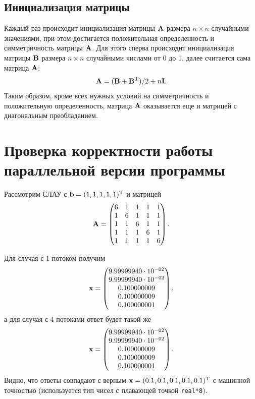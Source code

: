 \documentclass[12pt]{article}
\begin{document}
\subsection{Инициализация матрицы}

Каждый раз происходит инициализация матрицы $\vb{A}$ размера $n\times n$ случайными значениями, при этом достигается положительная определенность и симметричность матрицы $\vb{A}$. Для этого сперва происходит инициализация матрицы $\vb{B}$ размера $n\times n$ случайными числами от 0 до 1, далее считается сама матрица $\vb{A}$:
\begin{equation}
    \vb{A} = (\vb{B} + \vb{B}^\mathrm{T})/2 + n \vb{I}.
\end{equation}
Таким образом, кроме всех нужных условий на симметричность и положительную определенность, матрица $\vb{A}$ оказывается еще и матрицей с диагональным преобладанием.

\section{Проверка корректности работы параллельной версии программы}

Рассмотрим СЛАУ с $\vb{b} = (1,1,1,1,1)^\mathrm{T}$ и матрицей
\begin{equation*}
    \vb{A} = 
    \begin{pmatrix}
        6&1&1&1&1 \\
        1&6&1&1&1 \\
        1&1&6&1&1 \\
        1&1&1&6&1 \\
        1&1&1&1&6 \\
    \end{pmatrix}.
\end{equation*}

Для случая с 1 потоком получим
\begin{equation*}
    \vb{x} =
    \begin{pmatrix}
        9.99999940\cdot 10^{-02}\\
   9.99999940\cdot 10^{-02}\\
  0.100000009\\
  0.100000009\\  
  0.100000001\\
    \end{pmatrix},
\end{equation*}
а для случая с 4 потоками ответ будет такой же
\begin{equation*}
    \vb{x} =
    \begin{pmatrix}
        9.99999940\cdot 10^{-02}\\
   9.99999940\cdot 10^{-02}\\
  0.100000009\\
  0.100000009\\  
  0.100000001\\
    \end{pmatrix}.
\end{equation*}
Видно, что ответы совпадают с верным $\vb{x}=(0.1,0.1,0.1,0.1,0.1)^\mathrm{T}$ с машинной точностью (используется тип чисел с плавающей точкой \texttt{real*8}).
\end{document}
